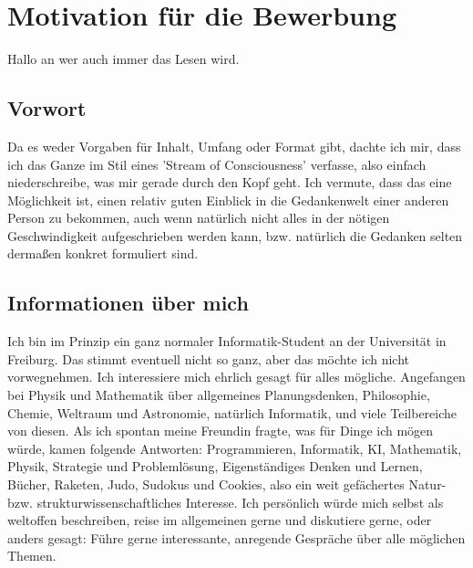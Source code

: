 \documentclass{scrartcl}
\begin{document}
\section*{Motivation für die Bewerbung}

Hallo an wer auch immer das Lesen wird. \\


\subsection*{Vorwort}

Da es weder Vorgaben für Inhalt, Umfang oder Format gibt, dachte ich mir, dass ich das Ganze
im Stil eines 'Stream of Consciousness' verfasse, also einfach niederschreibe, was mir gerade
durch den Kopf geht. Ich vermute, dass das eine Möglichkeit ist, einen relativ guten Einblick
in die Gedankenwelt einer anderen Person zu bekommen, auch wenn natürlich nicht alles in der
nötigen Geschwindigkeit aufgeschrieben werden kann, bzw. natürlich die Gedanken selten dermaßen
konkret formuliert sind.  \\


\subsection*{Informationen über mich}

Ich bin im Prinzip ein ganz normaler Informatik-Student an der Universität in Freiburg. Das
stimmt eventuell nicht so ganz, aber das möchte ich nicht vorwegnehmen. Ich interessiere mich
ehrlich gesagt für alles mögliche. Angefangen bei Physik und Mathematik über allgemeines
Planungsdenken, Philosophie, Chemie, Weltraum und Astronomie, natürlich Informatik, und viele
Teilbereiche von diesen.
Als ich spontan meine Freundin fragte, was für Dinge ich mögen würde, kamen folgende Antworten:
Programmieren, Informatik, KI, Mathematik, Physik, Strategie und Problemlösung,
Eigenständiges Denken und Lernen, Bücher, Raketen, Judo, Sudokus und Cookies, also ein weit
gefächertes Natur- bzw. strukturwissenschaftliches Interesse.
Ich persönlich würde mich selbst als weltoffen beschreiben, reise im allgemeinen gerne
und diskutiere gerne, oder anders gesagt: Führe gerne interessante, anregende Gespräche über
alle möglichen Themen.
\end{document}
